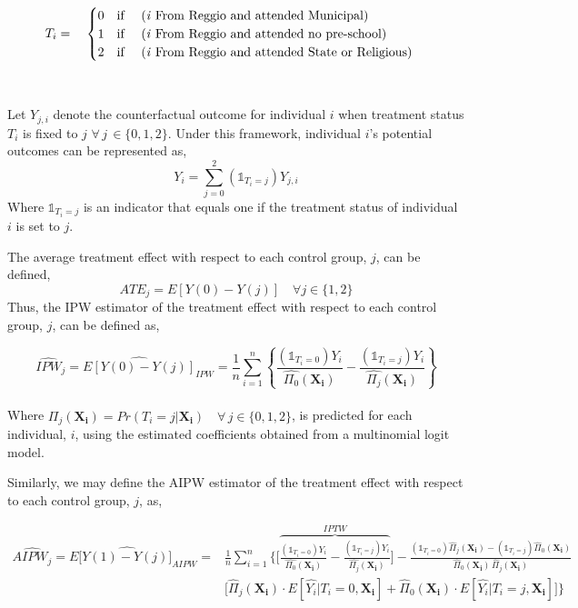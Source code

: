 \begin{equation}
T_i = \quad
\begin{cases}
0 \quad \text{if \quad (\textit{i} From Reggio and attended Municipal)} \\
1 \quad  \text{if \quad (\textit{i} From Reggio and attended no pre-school)} \\
2 \quad \text{if \quad (\textit{i} From Reggio and attended State or Religious)}  \\
\end{cases}
\end{equation}
~\\ ~\\
Let $Y_{j,i}$ denote the counterfactual outcome for individual $i$ when treatment status $T_i$ is fixed to $j$ $\forall \,  j \, \in \{0,1,2\}$. Under this framework, individual $i$'s potential outcomes can be represented as,
\begin{equation}
Y_i = \sum_{j=0}^{2}(\mathbb{1}_{T_i = j}) Y_{j,i}
\end{equation}
\noindent Where $\mathbb{1}_{T_i=j}$ is an indicator that equals one if the treatment status of individual $i$ is set to $j$.

\noindent The average treatment effect with respect to each control group, $j$, can be defined,
\begin{equation}
ATE_j = E[Y(0) - Y(j)] \quad \forall j \in \{1,2\}
\end{equation}
Thus, the IPW estimator of the treatment effect with respect to each control group, $j$, can be defined as, 

\begin{equation}\label{eq:IPWmulti}
\widehat{IPW}_j=\widehat{E[Y(0)-Y(j)]}_{IPW} = \frac{1}{n} \sum_{i=1}^{n} \left \{\frac{(\mathbb{1}_{T_i=0}) Y_i}{\hat{\Pi_0}(\boldsymbol{X_i})} - \frac{(\mathbb{1}_{T_i=j})Y_i}{\hat{\Pi_j}(\boldsymbol{X_i})}\right \}
\end{equation}
~\\
\noindent Where $\hat{\Pi_j}(\boldsymbol{X_i}) = Pr(T_i=j|\boldsymbol{X_i}) \quad \forall \, j \in \{0,1,2\}$, is predicted for each individual, $i$, using the estimated coefficients obtained from a multinomial logit model. 

Similarly, we may define the AIPW estimator of the treatment effect with respect to each control group, $j$, as,

\begin{align}\label{eq:AIPWmulti}
\widehat{AIPW_{j}} = E[\widehat{Y(1)-Y(j)]}_{AIPW} =& \frac{1}{n} \sum_{i=1}^{n}\bigg \{ \bigg[ \overbrace{ \frac{(\mathbb{1}_{T_i=0}) Y_i}{\hat{\Pi_0}(\boldsymbol{X_i})} - \frac{(\mathbb{1}_{T_i=j})Y_i}{\hat{\Pi_j}(\boldsymbol{X_i})}}^{IPTW}  \bigg]- \frac{(\mathbb{1}_{T_i=0}) \hat{\Pi}_j(\boldsymbol{X_i}) - (\mathbb{1}_{T_i=j}) \hat{\Pi}_0(\boldsymbol{X_i})}{\hat{\Pi}_0(\boldsymbol{X_i}) \, \hat{\Pi}_j(\boldsymbol{X_i})} \nonumber \\[10pt]
& \bigg[ \hat{\Pi}_j(\boldsymbol{X_i}) \cdot E[\hat{Y_i}|T_i=0,\boldsymbol{X_i}] +\hat{\Pi}_0(\boldsymbol{X_i}) \cdot E[\hat{Y_i}|T_i=j,\boldsymbol{X_i}] \bigg] \bigg \}
\end{align}